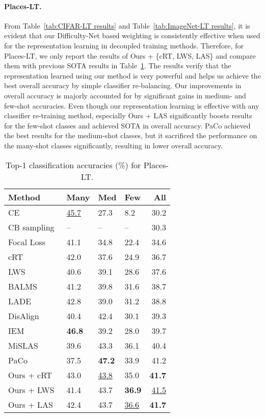 \documentclass[10pt,twocolumn,letterpaper]{article}
\begin{document}
\paragraph{\bf Places-LT.} 
From Table~\ref{tab:CIFAR-LT results} and Table~\ref{tab:ImageNet-LT results}, it is evident that our Difficulty-Net based weighting is consistently effective when used for the representation learning in decoupled training methods. 
Therefore, for Places-LT, we only report the results of Ours + \{cRT, LWS, LAS\} and compare them with previous SOTA results in Table~\ref{tab:Places results}. 
The results verify that the representation learned using our method is very powerful and helps us achieve the best overall accuracy by simple classifier re-balancing. Our improvements in overall accuracy is majorly accounted for by significant gains in medium- and few-shot accuracies. 
Even though our representation learning is effective with any classifier re-training method, especially Ours + LAS significantly boosts results for the few-shot classes and achieved SOTA in overall accuracy. PaCo achieved the best results for the medium-shot classes, but it sacrificed the performance on the many-shot classes significantly, resulting in lower overall accuracy. 
\begin{table}
  \begin{center}
    {\small{
\begin{tabular}{llllr}
\toprule
Method &  Many & Med & Few & All\\
    \midrule
CE & \underline{45.7} & 27.3 & 8.2 & 30.2 \\
    CB sampling~\cite{decoupling} & -- & -- & -- & 30.3\\
    Focal Loss~\cite{focalloss} & 41.1 & 34.8 & 22.4 & 34.6 \\
cRT~\cite{decoupling} & 42.0 & 37.6  & 24.9 & 36.7 \\
     LWS~\cite{decoupling} & 40.6 & 39.1 & 28.6 & 37.6 \\
BALMS~\cite{BALMS} & 41.2 & 39.8 & 31.6 & 38.7\\
     LADE~\cite{lade} & 42.8& 39.0& 31.2& 38.8\\
     DisAlign~\cite{disalign} & 40.4 & 42.4 & 30.1 & 39.3 \\
     IEM~\cite{IEM} &\textbf{46.8}& 39.2& 28.0 & 39.7\\
     MiSLAS~\cite{mislas} & 39.6 & 43.3 & 36.1 & 40.4\\
     PaCo~\cite{PaCo} & 37.5 & \textbf{47.2} & 33.9 & 41.2 \\
     


Ours + cRT &43.0 & \underline{43.8} & 35.0& \textbf{41.7}\\ 
     Ours + LWS & 41.4 & 43.7 & \textbf{36.9} & \underline{41.5}\\ 
     Ours + LAS & 42.4 & 43.7 & \underline{36.6} & \textbf{41.7} \\
    \bottomrule

\end{tabular}
}}
\end{center}
\caption{Top-1 classification accuracies (\%) for Places-LT. }
  \label{tab:Places results}
\end{table}
\end{document}
